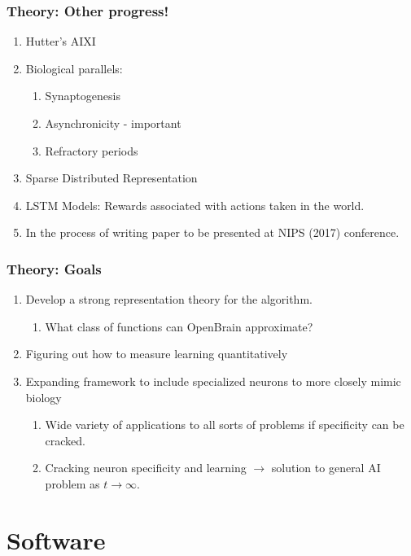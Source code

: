 \documentclass{beamer}
\begin{document}
    \begin{frame}
    \frametitle{Theory: Other progress!}
    	\begin{enumerate}
            \item Hutter's AIXI
            \item Biological parallels:
           	\begin{enumerate}
            	\item Synaptogenesis
                \item Asynchronicity - important
                \item Refractory periods
            \end{enumerate}
           \item Sparse Distributed Representation
           \item LSTM Models: Rewards associated with actions taken in the world.
           \item In the process of writing paper to be presented at NIPS (2017) conference.
        \end{enumerate}
    \end{frame}
    \begin{frame}
   	\frametitle{Theory: Goals}
    	\begin{enumerate}
       		\item Develop a strong representation theory for the algorithm.
          \begin{enumerate}
              \item What class of functions can OpenBrain approximate?         
          \end{enumerate}
            \item Figuring out how to measure learning quantitatively
            \item Expanding framework to include specialized neurons to more closely mimic biology
            	\begin{enumerate}
                	\item Wide variety of applications to all sorts of problems if specificity can be 							cracked.
					\item Cracking neuron specificity and learning $\rightarrow$ solution to general AI 							problem as $t \to \infty$.
                \end{enumerate}
        \end{enumerate}
    \end{frame}
    \section{Software}
\end{document}
